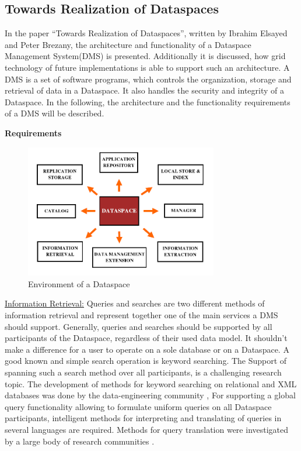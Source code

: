 \subsection{Towards Realization of Dataspaces}

In the paper ``Towards Realization of Dataspaces'', written by Ibrahim Elsayed and Peter Brezany\cite{1698348}, the architecture and functionality of a Dataspace Management System(DMS) is presented. Additionally it is discussed, how grid technology of future implementations is able to support such an architecture. A DMS is a set of software programs, which controls the organization, storage and retrieval of data in a Dataspace. It also handles the security and integrity of a Dataspace.
In the following, the architecture and the functionality requirements of a DMS will be described.   

\textbf{{\large Requirements}}

\begin{figure}[H]
	\begin{center}
		\includegraphics[width=0.75\textwidth]{figures/TowardsRealizationOfDataspaces1.png}
	\end{center}
	\caption{Environment of  a Dataspace}
	\label{TowardsRealizationOfDataspacesEnvironment}
\end{figure}

\uline{Information Retrieval:} Queries and searches are two different methods of information retrieval and represent together one of the main services a DMS should support. Generally, queries and searches should be supported by all participants of the Dataspace, regardless of their used data model. It shouldn't make a difference for a user to operate on a sole database or on a Dataspace. A good known and simple search operation is keyword searching. The Support of spanning such a search method over all participants, is a challenging research topic. The development of methods for keyword searching on relational and XML databases was done by the data-engineering community \cite{994693, Guo:2003:XRK:872757.872762, Hristidis:2002:DKS:1287369.1287427}, For supporting a global query functionality allowing to formulate uniform queries on all Dataspace participants, intelligent methods for interpreting and translating of queries in several languages are required. Methods for query translation were investigated by a large body of research communities \cite{Carey00xperanto:publishing, 1319983}. 

